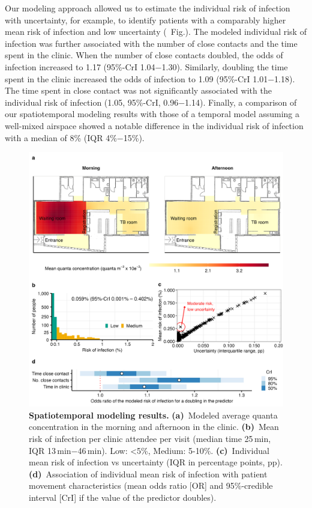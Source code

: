 \documentclass[fleqn,11pt]{wlscirep}
\begin{document}
Our modeling approach allowed us to estimate the individual risk of infection with uncertainty, for example, to identify patients with a comparably higher mean risk of infection and low uncertainty (\supp~Fig.). The modeled individual risk of infection was further associated with the number of close contacts and the time spent in the clinic. When the number of close contacts doubled, the odds of infection increased to 1.17 (95\%-CrI 1.04$-$1.30). Similarly, doubling the time spent in the clinic increased the odds of infection to 1.09 (95\%-CrI 1.01$-$1.18). The time spent in close contact was not significantly associated with the individual risk of infection (1.05, 95\%-CrI, 0.96$-$1.14). Finally, a comparison of our spatiotemporal modeling results with those of a temporal model assuming a well-mixed airspace showed a notable difference in the individual risk of infection with a median of 8\% (IQR 4\%$-$15\%).  

\begin{figure}
    \centering
    \includegraphics{results/modeling/main-figure.png}
    \caption{\textbf{Spatiotemporal modeling results.} \textbf{(a)}~Modeled average quanta concentration in the morning and afternoon in the clinic. \textbf{(b)}~Mean risk of infection per clinic attendee per visit (median time 25\,min, IQR 13\,min$-$46\,min). Low: <5\%, Medium: 5-10\%. \textbf{(c)}~Individual mean risk of infection vs uncertainty (IQR in percentage points, pp). \textbf{(d)}~Association of individual mean risk of infection with patient movement characteristics (mean odds ratio [OR] and 95\%-credible interval [CrI] if the value of the predictor doubles).}
    \label{fig:main-modeling-results}
\end{figure}
\end{document}
